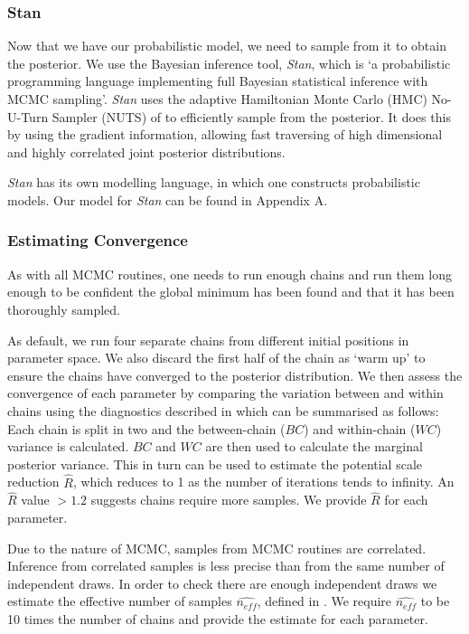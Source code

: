 \documentclass[useAMS,usenatbib]{mnras}
\begin{document}
\subsubsection{Stan}
Now that we have our probabilistic model, we need to sample from it to obtain the posterior. We use the Bayesian inference tool, \textit{Stan}, which is `a probabilistic programming language implementing full Bayesian statistical inference with MCMC sampling'. \textit{Stan} uses the adaptive Hamiltonian Monte Carlo (HMC) No-U-Turn Sampler (NUTS) of \cite{Hoffman:2013} to efficiently sample from the posterior. It does this by using the gradient information, allowing fast traversing of high dimensional and highly correlated joint posterior distributions. 

\textit{Stan} has its own modelling language, in which one constructs probabilistic models. Our model for \textit{Stan} can be found in Appendix A.
\subsubsection{Estimating Convergence}\label{sec:conv}
As with all MCMC routines, one needs to run enough chains and run them long enough to be confident the global minimum has been found and that it has been thoroughly sampled. 

As default, we run four separate chains from different initial positions in parameter space. We also discard the first half of the chain as `warm up' to ensure the chains have converged to the posterior distribution. We then assess the convergence of each parameter by comparing the variation between and within chains using the diagnostics described in \cite{BDA3} which can be summarised as follows: Each chain is split in two and the between-chain ($BC$) and within-chain ($WC$) variance is calculated. $BC$ and $WC$ are then used to calculate the marginal posterior variance. This in turn can be used to estimate the potential scale reduction $\hat{R}$, which reduces to 1 as the number of iterations tends to infinity. An $\hat{R}$ value $> 1.2$ suggests chains require more samples. We provide $\hat{R}$ for each parameter.

Due to the nature of MCMC, samples from MCMC routines are correlated. Inference from correlated samples is less precise than from the same number of independent draws. In order to check there are enough independent draws we estimate the effective number of samples $\hat{n_{eff}}$, defined in \cite{BDA3}. We require $\hat{n_{eff}}$ to be 10 times the number of chains and provide the estimate for each parameter.
\end{document}
